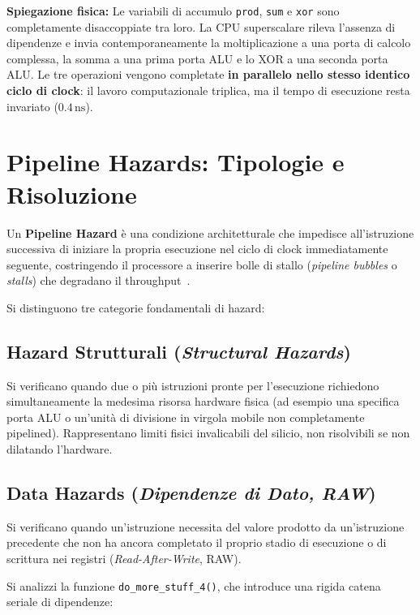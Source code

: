 \textbf{Spiegazione fisica:}
Le variabili di accumulo \texttt{prod}, \texttt{sum} e \texttt{xor} sono completamente disaccoppiate tra loro. La CPU superscalare rileva l'assenza di dipendenze e invia contemporaneamente la moltiplicazione a una porta di calcolo complessa, la somma a una prima porta ALU e lo XOR a una seconda porta ALU. Le tre operazioni vengono completate \textbf{in parallelo nello stesso identico ciclo di clock}: il lavoro computazionale triplica, ma il tempo di esecuzione resta invariato ($0.4\,\text{ns}$).

\FloatBarrier
\section{Pipeline Hazards: Tipologie e Risoluzione}
\label{sec:pipeline-hazards}

Un \textbf{Pipeline Hazard} \`e una condizione architetturale che impedisce all'istruzione successiva di iniziare la propria esecuzione nel ciclo di clock immediatamente seguente, costringendo il processore a inserire bolle di stallo (\textit{pipeline bubbles} o \textit{stalls}) che degradano il throughput~\cite{bakhvalov2024,slotin2023}.

Si distinguono tre categorie fondamentali di hazard:

\FloatBarrier
\subsection{Hazard Strutturali (\textit{Structural Hazards})}
\label{subsec:structural-hazards}
Si verificano quando due o pi\`u istruzioni pronte per l'esecuzione richiedono simultaneamente la medesima risorsa hardware fisica (ad esempio una specifica porta ALU o un'unit\`a di divisione in virgola mobile non completamente pipelined). Rappresentano limiti fisici invalicabili del silicio, non risolvibili se non dilatando l'hardware.

\FloatBarrier
\subsection{Data Hazards (\textit{Dipendenze di Dato, RAW})}
\label{subsec:data-hazards}
Si verificano quando un'istruzione necessita del valore prodotto da un'istruzione precedente che non ha ancora completato il proprio stadio di esecuzione o di scrittura nei registri (\textit{Read-After-Write}, RAW). 

Si analizzi la funzione \texttt{do\_more\_stuff\_4()}, che introduce una rigida catena seriale di dipendenze:


